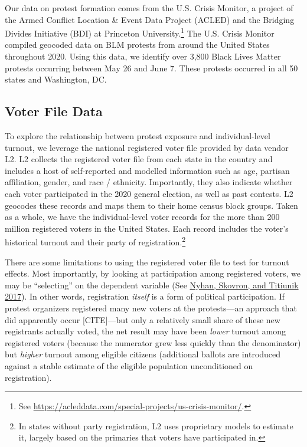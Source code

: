 \documentclass[
  12pt,
]{article}
\begin{document}
Our data on protest formation comes from the U.S. Crisis Monitor, a project of the Armed Conflict Location \& Event Data Project (ACLED) and the Bridging Divides Initiative (BDI) at Princeton University.\footnote{See \url{https://acleddata.com/special-projects/us-crisis-monitor/}.} The U.S. Crisis Monitor compiled geocoded data on BLM protests from around the United States throughout 2020. Using this data, we identify over 3,800 Black Lives Matter protests occurring between May 26 and June 7. These protests occurred in all 50 states and Washington, DC.

\hypertarget{voter-file-data}{%
\subsection*{Voter File Data}\label{voter-file-data}}

To explore the relationship between protest exposure and individual-level turnout, we leverage the national registered voter file provided by data vendor L2. L2 collects the registered voter file from each state in the country and includes a host of self-reported and modelled information such as age, partisan affiliation, gender, and race / ethnicity. Importantly, they also indicate whether each voter participated in the 2020 general election, as well as past contests. L2 geocodes these records and maps them to their home census block groups. Taken as a whole, we have the individual-level voter records for the more than 200 million registered voters in the United States. Each record includes the voter's historical turnout and their party of registration.\footnote{In states without party registration, L2 uses proprietary models to estimate it, largely based on the primaries that voters have participated in.}

There are some limitations to using the registered voter file to test for turnout effects. Most importantly, by looking at participation among registered voters, we may be ``selecting'' on the dependent variable (See \protect\hyperlink{ref-Nyhan2017}{Nyhan, Skovron, and Titiunik 2017}). In other words, registration \emph{itself} is a form of political participation. If protest organizers registered many new voters at the protests---an approach that did apparently occur {[}CITE{]}---but only a relatively small share of these new registrants actually voted, the net result may have been \emph{lower} turnout among registered voters (because the numerator grew less quickly than the denominator) but \emph{higher} turnout among eligible citizens (additional ballots are introduced against a stable estimate of the eligible population unconditioned on registration).
\end{document}
